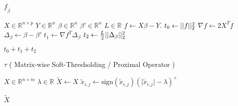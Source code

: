 \documentclass[letterpaper,11pt]{article}
\begin{document}
\FloatBarrier
\begin{algorithm}[!htbp]
  \caption{$f_{\widetilde{ \beta }}$ }
  \begin{algorithmic}[1]
  \Statex
  \Input{}
  \Statex $X \in \mathbb{R}^{n \times p} $ 
  \Statex $Y \in \mathbb{R}^n$  
  \Statex $\beta \in \mathbb{R}^n$  
  \Statex $\beta' \in \mathbb{R}^n$  
  \Statex $L \in \mathbb{R}$  
    \State $f \gets X \beta - Y$.
    \State $t_0 \gets \lvert \lvert  f  \rvert \rvert_2^2$
    \State $\nabla f \gets 2 X^T f$
    \State $\Delta_{\beta} \gets \beta - \beta'$
    \State $t_1 \gets \nabla f^T \Delta_{\beta}$
    \State $t_2 \gets \frac{L}{2} \lvert \lvert  \Delta_{\beta}  \rvert \rvert_2^2$
  \end{algorithmic}
  \Return $t_0 + t_1 + t_2$
\end{algorithm}
\FloatBarrier

\FloatBarrier
\begin{algorithm}[!htbp]
  \caption{$\tau$ ( Matrix-wise Soft-Thresholding / Proximal Operator ) }
  \begin{algorithmic}[1]
  \Statex
  \Input{}
  \Statex $X \in \mathbb{R}^{n \times m} $ 
  \Statex $\lambda \in \mathbb{R}$  
    \State $\widetilde{X} \gets X$ 
      \State $\widetilde{x}_{i,j} \gets \text{sign}( \widetilde{x}_{i,j} ) \left( \lvert \widetilde{x}_{i,j} \rvert - \lambda \right)^{+}$
    \EndFor
  \end{algorithmic}
  \Return $\widetilde{X}$
\end{algorithm}
\FloatBarrier
\end{document}
